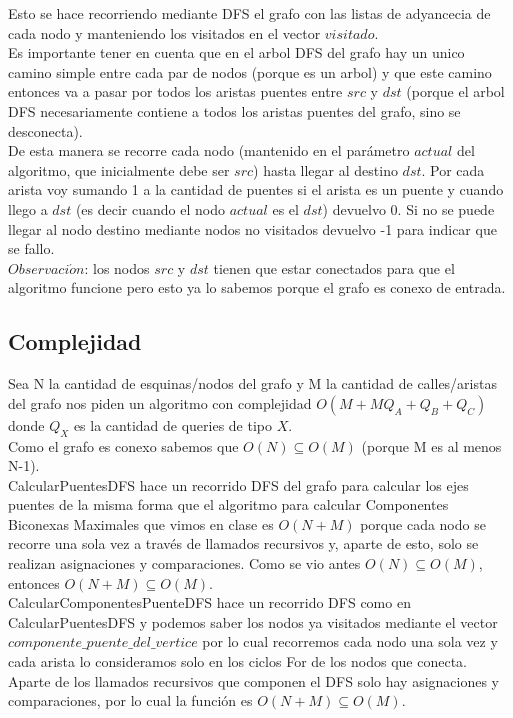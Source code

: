 Esto se hace recorriendo mediante DFS el grafo con las listas de adyancecia de cada nodo y manteniendo los visitados en el vector
$visitado$. \\
Es importante tener en cuenta que en el arbol DFS del grafo hay un unico camino simple entre cada par de nodos (porque es un arbol)
y que este camino entonces va a pasar por todos los  aristas puentes entre $src$ y $dst$ (porque el arbol DFS necesariamente contiene
a todos los aristas puentes del grafo, sino se desconecta). \\
De esta manera se recorre cada nodo (mantenido en el parámetro $actual$ del algoritmo, que inicialmente debe ser $src$)
hasta llegar al destino $dst$. Por cada arista voy sumando 1 a la cantidad de puentes si el arista es un puente y cuando llego a $dst$ 
(es decir cuando el nodo $actual$ es el $dst$) devuelvo 0. Si no se puede llegar al nodo destino mediante nodos no visitados devuelvo -1
para indicar que se fallo. \\

$Observaci\acute{o}n$: los nodos $src$ y $dst$ tienen que estar conectados para que el algoritmo funcione pero esto ya lo sabemos
porque el grafo es conexo de entrada. \\

\subsection{Complejidad}

Sea N la cantidad de esquinas/nodos del grafo y M la cantidad de calles/aristas del grafo nos piden un algoritmo con complejidad
$O(M+MQ_A+Q_B+Q_C)$ donde $Q_X$ es la cantidad de queries de tipo $X$. \\

Como el grafo es conexo sabemos que $O(N) \subseteq O(M)$ (porque M es al menos N-1). \\

CalcularPuentesDFS hace un recorrido DFS del grafo para calcular los ejes puentes de la misma forma que el algoritmo para calcular
Componentes Biconexas Maximales que vimos en clase es $O(N+M)$ porque cada nodo se recorre una sola vez a través de llamados recursivos
y, aparte de esto, solo se realizan asignaciones y comparaciones. Como se vio antes $O(N) \subseteq O(M)$, entonces $O(N+M) \subseteq O(M)$.  \\

CalcularComponentesPuenteDFS hace un recorrido DFS como en CalcularPuentesDFS y podemos saber los nodos ya visitados mediante el vector
$componente\_puente\_del\_vertice$ por lo cual recorremos cada nodo una sola vez y cada arista lo consideramos solo en los ciclos For de
los nodos que conecta. Aparte de los llamados recursivos que componen el DFS solo hay asignaciones y comparaciones, por lo cual la funci\'on
es $O(N+M) \subseteq O(M)$. \\

